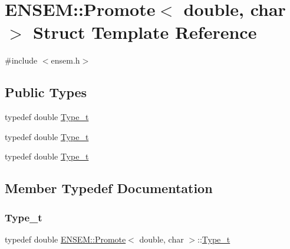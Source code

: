 \hypertarget{structENSEM_1_1Promote_3_01double_00_01char_01_4}{}\section{E\+N\+S\+EM\+:\+:Promote$<$ double, char $>$ Struct Template Reference}
\label{structENSEM_1_1Promote_3_01double_00_01char_01_4}


{\ttfamily \#include $<$ensem.\+h$>$}

\subsection*{Public Types}
\begin{DoxyCompactItemize}
\item 
typedef double \mbox{\hyperlink{structENSEM_1_1Promote_3_01double_00_01char_01_4_aa50bd72d8e60a859d481548688596791}{Type\+\_\+t}}
\item 
typedef double \mbox{\hyperlink{structENSEM_1_1Promote_3_01double_00_01char_01_4_aa50bd72d8e60a859d481548688596791}{Type\+\_\+t}}
\item 
typedef double \mbox{\hyperlink{structENSEM_1_1Promote_3_01double_00_01char_01_4_aa50bd72d8e60a859d481548688596791}{Type\+\_\+t}}
\end{DoxyCompactItemize}


\subsection{Member Typedef Documentation}
\mbox{\label{structENSEM_1_1Promote_3_01double_00_01char_01_4_aa50bd72d8e60a859d481548688596791}} 
\subsubsection{\texorpdfstring{Type\_t}{Type\_t}\hspace{0.1cm}{\footnotesize\ttfamily [1/3]}}
{\footnotesize\ttfamily typedef double \mbox{\hyperlink{structENSEM_1_1Promote}{E\+N\+S\+E\+M\+::\+Promote}}$<$ double, char $>$\+::\mbox{\hyperlink{structENSEM_1_1Promote_3_01double_00_01char_01_4_aa50bd72d8e60a859d481548688596791}{Type\+\_\+t}}}

